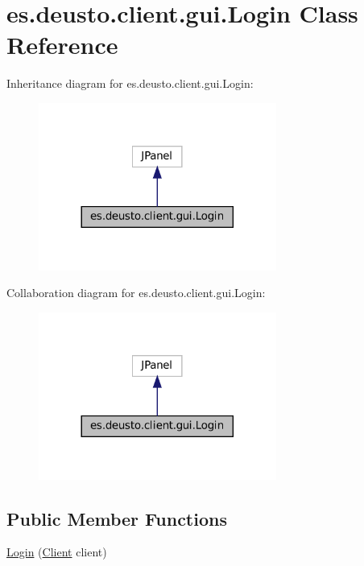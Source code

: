 \hypertarget{classes_1_1deusto_1_1client_1_1gui_1_1_login}{}\section{es.\+deusto.\+client.\+gui.\+Login Class Reference}
\label{classes_1_1deusto_1_1client_1_1gui_1_1_login}


Inheritance diagram for es.\+deusto.\+client.\+gui.\+Login\+:\nopagebreak
\begin{figure}[H]
\begin{center}
\leavevmode
\includegraphics[width=221pt]{classes_1_1deusto_1_1client_1_1gui_1_1_login__inherit__graph}
\end{center}
\end{figure}


Collaboration diagram for es.\+deusto.\+client.\+gui.\+Login\+:\nopagebreak
\begin{figure}[H]
\begin{center}
\leavevmode
\includegraphics[width=221pt]{classes_1_1deusto_1_1client_1_1gui_1_1_login__coll__graph}
\end{center}
\end{figure}
\subsection*{Public Member Functions}
\begin{DoxyCompactItemize}
\item 
\mbox{\hyperlink{classes_1_1deusto_1_1client_1_1gui_1_1_login_af565f7accded6e1e3d09b03d6baeaeb4}{Login}} (\mbox{\hyperlink{classes_1_1deusto_1_1client_1_1_client}{Client}} client)
\end{DoxyCompactItemize}


